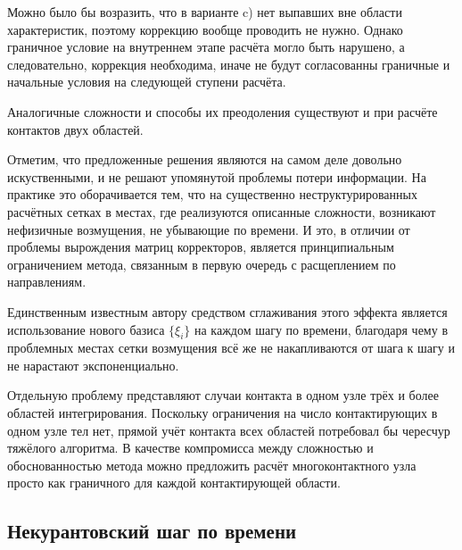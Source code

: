 Можно было бы возразить, что в варианте c) нет выпавших вне области характеристик, 
поэтому коррекцию вообще проводить не нужно. Однако граничное условие на внутреннем этапе расчёта 
могло быть нарушено, а следовательно, коррекция необходима, иначе не будут  
согласованны граничные и начальные условия на следующей ступени расчёта.

Аналогичные сложности и способы их преодоления существуют и при расчёте контактов двух областей. 

Отметим, что предложенные решения являются на самом деле довольно искуственными, 
и не решают упомянутой проблемы потери информации. На практике это оборачивается тем, 
что на существенно неструктурированных расчётных сетках в местах, где реализуются 
описанные сложности, возникают нефизичные возмущения, не убывающие по времени. 
И это, в отличии от проблемы вырождения матриц корректоров, является принципиальным 
ограничением метода, связанным в первую очередь с расщеплением по направлениям.

Единственным известным автору средством сглаживания этого эффекта является 
использование нового базиса $\{\xi_i\}$ на каждом шагу по времени, благодаря 
чему в проблемных местах сетки 
возмущения всё же не накапливаются от шага к шагу и не нарастают экспоненциально.

Отдельную проблему представляют случаи контакта в одном узле 
трёх и более областей интегрирования. Поскольку ограничения на 
число контактирующих в одном узле тел нет, 
прямой учёт контакта всех областей потребовал бы чересчур тяжёлого алгоритма. 
В качестве компромисса между сложностью и обоснованностью метода можно предложить 
расчёт многоконтактного узла просто как граничного для каждой контактирующей области. 


\subsection{Некурантовский шаг по времени}
